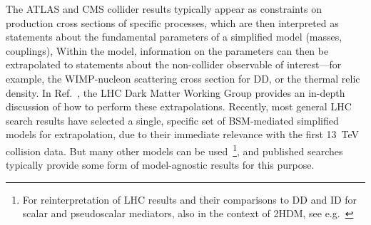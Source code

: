 
The ATLAS and CMS collider results typically appear as constraints on production cross sections of specific processes, which are then interpreted as statements about the fundamental parameters of a simplified model (masses, couplings), Within the model, information on the parameters can then be extrapolated to statements about the non-collider observable of interest---for example, the WIMP-nucleon scattering cross section for DD, or the thermal relic density.
In Ref.~\cite{Boveia:2016mrp}, the LHC Dark Matter Working Group provides an in-depth discussion of how to perform these extrapolations.
Recently, most general LHC search results have selected a single, specific set of BSM-mediated simplified models for extrapolation, due to their immediate relevance with the first 13~TeV collision data. But many other models can be used~\footnote{For reinterpretation of LHC results and their comparisons to DD and ID for scalar and pseudoscalar mediators, also in the context of 2HDM, see e.g.~\cite{Athron:2017kgt,Banerjee:2017wxi,Ipek:2014gua,Bell:2016ekl}}, and published searches typically provide some form of model-agnostic results for this purpose.

